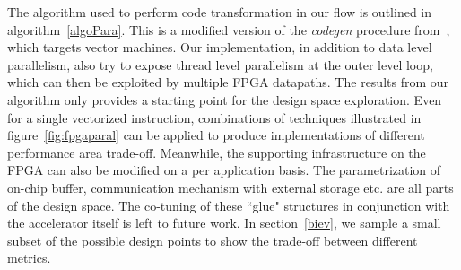 The algorithm used to perform code transformation in our flow is outlined in algorithm~\ref{algoPara}. This is a modified version of the \textit{codegen}
procedure from~\cite{Kennedy:2001:OCM:502981}, which targets vector machines.
Our implementation, in addition to data level parallelism, also try to expose
thread level parallelism at the outer level loop, which can then be exploited by multiple FPGA datapaths. 
The results from our algorithm only provides a starting point for the design space exploration. Even for a single vectorized instruction, combinations of techniques illustrated in figure~\ref{fig:fpgaparal} can be applied to
produce implementations of different performance area trade-off. Meanwhile, 
the supporting infrastructure on the FPGA can also be modified on a per
application basis. The parametrization of on-chip buffer, communication mechanism with external
storage etc. are all parts of the design space. The co-tuning of these ``glue"
structures in conjunction
with the accelerator itself is left to future work.  In section~\ref{biev}, we sample a small subset of the possible design points
to show the trade-off between different metrics.


